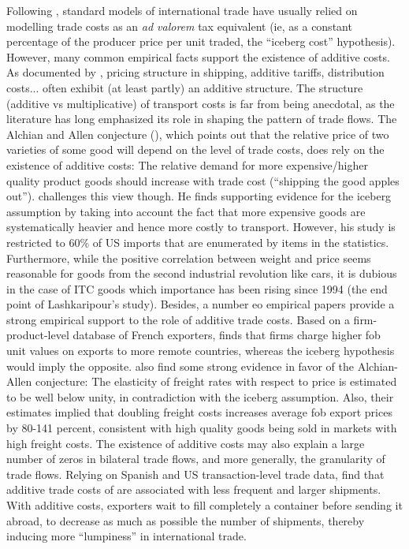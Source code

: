 \documentclass[a4paper,11pt]{article}
\begin{document}
Following \citet{samuelson1954}, standard models of international trade have usually relied on modelling trade costs as an \emph{ad valorem} tax equivalent (ie, as a constant percentage of the producer price per unit traded, the ``iceberg cost'' hypothesis). However, many common empirical facts support the existence of additive costs. As documented by \citet{Irrazabal_2015}, pricing structure in shipping, additive tariffs, distribution costs... often exhibit (at least partly) an additive structure. The structure (additive vs multiplicative) of transport costs is far from being anecdotal, as the literature has long emphasized its role in shaping the pattern of trade flows. The Alchian and Allen conjecture (\citealp{alchian}), which points out that the relative price of two varieties of some good will depend on the level of trade costs, does rely on the existence of additive costs: The relative demand for more expensive/higher quality product goods should increase with trade cost (``shipping the good apples out''). \citet{lashkaripour} challenges this view though. He finds supporting evidence for the iceberg assumption by taking into account the fact that more expensive goods are systematically heavier and hence more costly to transport. However, his study is restricted to 60\% of US imports that are enumerated by items in the statistics. Furthermore, while the positive correlation between weight and price seems reasonable for goods from the second industrial revolution like cars, it is dubious in the case of ITC goods which importance has been rising since 1994 (the end point of Lashkaripour's study). Besides, a number eo empirical papers provide a strong empirical support to the role of additive trade costs. Based on a firm-product-level database of French exporters, \citet{martin2012} finds that firms charge higher fob unit values on exports to more remote countries, whereas the iceberg hypothesis would imply the opposite. \citet{hummels_skiba} also find some strong evidence in favor of the Alchian-Allen conjecture: The elasticity of freight rates with respect to price is estimated to be well below unity, in contradiction with the iceberg assumption. Also, their estimates implied that doubling freight costs increases average fob export prices by 80-141 percent, consistent with high quality goods being sold in markets with high freight costs. The existence of additive costs may also explain a large number of zeros in bilateral trade flows, and more generally, the granularity of trade flows. Relying on Spanish and US transaction-level trade data, \citet{Hornok14} find that additive trade costs of are associated with less frequent and larger shipments. With additive costs, exporters wait to fill completely a container before sending it abroad, to decrease as much as possible the number of shipments, thereby inducing more ``lumpiness'' in international trade. \smallskip
\end{document}
